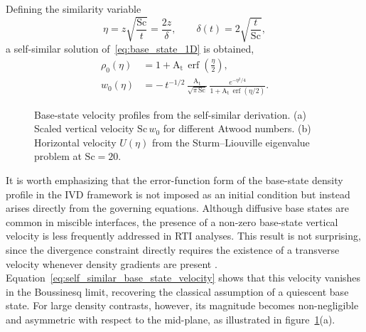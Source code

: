\documentclass[11pt]{article}
\newcommand{\Atw}{\mathrm{A_t}}
\newcommand{\Sch}{\mathrm{Sc}}
\DeclareMathOperator{\erf}{erf}
\newif\ifloadfig
\newcommand{\figfile}[1]{\ifloadfig\fi}
\begin{document}
Defining the similarity variable
\begin{equation}
    \eta = z \sqrt{\frac{\Sch}{t}} = \frac{2z}{\delta}, \qquad \delta(t) = 2\sqrt{\frac{t}{\Sch}},
\end{equation}
a self-similar solution of~\eqref{eq:base_state_1D} is obtained,
\begin{subequations}
\begin{align}
    \rho_{0}(\eta)
    &=
    1 + \Atw\,\erf\!\left(\frac{\eta}{2}\right),
    \label{eq:self_similar_base_state_density}
    \\
    w_0(\eta)
    &=
    -\,t^{-1/2}\,
    \frac{\Atw}{\sqrt{\pi\,\Sch}}\,
    \frac{e^{-\eta^{2}/4}}
    {1 + \Atw\,\erf\!\left(\eta/2\right)} .
    \label{eq:self_similar_base_state_velocity}
\end{align}
\end{subequations}
\begin{figure}
    \centering
    \begin{minipage}[t]{0.49\textwidth}
        \centering
        \vspace{0pt}
        \figfile{figures/w0_profile}
    \end{minipage}
    \hfill
    \begin{minipage}[t]{0.49\textwidth}
        \centering
        \vspace{0pt}
        \figfile{figures/eigenvector_k1_comparison}
    \end{minipage}
    \caption{Base-state velocity profiles from the self-similar derivation. (a) Scaled vertical velocity \(\Sch\,w_0\) for different Atwood numbers. (b) Horizontal velocity \(U(\eta)\) from the Sturm--Liouville eigenvalue problem at \(\Sch = 20\).}
    \label{fig:base_state_w0_ueta}
\end{figure}
It is worth emphasizing that the error-function form of the base-state density profile in the IVD framework is not imposed as an initial condition but instead arises directly from the governing equations. Although diffusive base states are common in miscible interfaces, the presence of a non-zero base-state vertical velocity is less frequently addressed in RTI analyses. This result is not surprising, since the divergence constraint directly requires the existence of a transverse velocity whenever density gradients are present \citep{bretonnet-et-al-2007}. Equation~\eqref{eq:self_similar_base_state_velocity} shows that this velocity vanishes in the Boussinesq limit, recovering the classical assumption of a quiescent base state. For large density contrasts, however, its magnitude becomes non-negligible and asymmetric with respect to the mid-plane, as illustrated in figure~\ref{fig:base_state_w0_ueta}(a).
\end{document}
